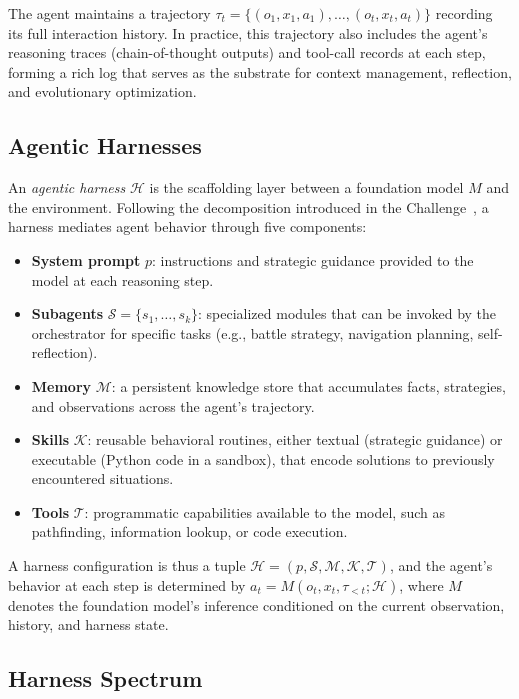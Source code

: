 The agent maintains a trajectory $\tau_t = \{(o_1, x_1, a_1), \ldots, (o_t, x_t, a_t)\}$ recording its full interaction history. In practice, this trajectory also includes the agent's reasoning traces (chain-of-thought outputs) and tool-call records at each step, forming a rich log that serves as the substrate for context management, reflection, and evolutionary optimization.

\subsection{Agentic Harnesses}\label{sec:formal_harness}

An \emph{agentic harness} $\mathcal{H}$ is the scaffolding layer between a foundation model $M$ and the environment. Following the decomposition introduced in the \pokeagent{} Challenge~\citep{karten2025pokeagent}, a harness mediates agent behavior through five components:
\begin{itemize}[leftmargin=*]
    \item \textbf{System prompt} $p$: instructions and strategic guidance provided to the model at each reasoning step.
    \item \textbf{Subagents} $\mathcal{S} = \{s_1, \ldots, s_k\}$: specialized modules that can be invoked by the orchestrator for specific tasks (e.g., battle strategy, navigation planning, self-reflection).
    \item \textbf{Memory} $\mathcal{M}$: a persistent knowledge store that accumulates facts, strategies, and observations across the agent's trajectory.
    \item \textbf{Skills} $\mathcal{K}$: reusable behavioral routines, either textual (strategic guidance) or executable (Python code in a sandbox), that encode solutions to previously encountered situations.
    \item \textbf{Tools} $\mathcal{T}$: programmatic capabilities available to the model, such as pathfinding, information lookup, or code execution.
\end{itemize}

A harness configuration is thus a tuple $\mathcal{H} = (p, \mathcal{S}, \mathcal{M}, \mathcal{K}, \mathcal{T})$, and the agent's behavior at each step is determined by $a_t = M(o_t, x_t, \tau_{<t}; \mathcal{H})$, where $M$ denotes the foundation model's inference conditioned on the current observation, history, and harness state.

\subsection{Harness Spectrum}\label{sec:harness_spectrum}

